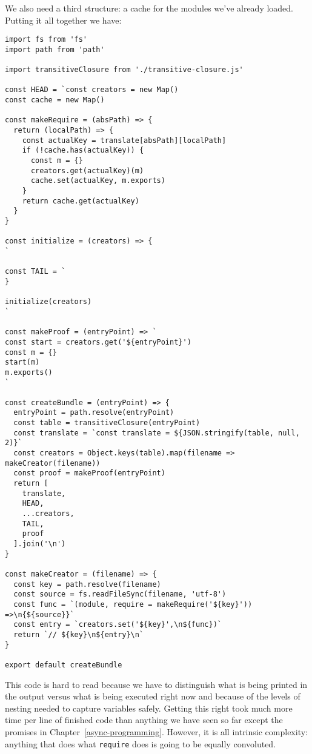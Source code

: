 \documentclass[krantzl]{krantz}
\newcommand{\chapref}[1]{Chapter~\ref{#1}}
\begin{document}
We also need a third structure:
a cache for the modules we've already loaded.
Putting it all together we have:


\begin{lstlisting}[frame=single,frameround=tttt]
import fs from 'fs'
import path from 'path'

import transitiveClosure from './transitive-closure.js'

const HEAD = `const creators = new Map()
const cache = new Map()

const makeRequire = (absPath) => {
  return (localPath) => {
    const actualKey = translate[absPath][localPath]
    if (!cache.has(actualKey)) {
      const m = {}
      creators.get(actualKey)(m)
      cache.set(actualKey, m.exports)
    }
    return cache.get(actualKey)
  }
}

const initialize = (creators) => {
`

const TAIL = `
}

initialize(creators)
`

const makeProof = (entryPoint) => `
const start = creators.get('${entryPoint}')
const m = {}
start(m)
m.exports()
`

const createBundle = (entryPoint) => {
  entryPoint = path.resolve(entryPoint)
  const table = transitiveClosure(entryPoint)
  const translate = `const translate = ${JSON.stringify(table, null, 2)}`
  const creators = Object.keys(table).map(filename => makeCreator(filename))
  const proof = makeProof(entryPoint)
  return [
    translate,
    HEAD,
    ...creators,
    TAIL,
    proof
  ].join('\n')
}

const makeCreator = (filename) => {
  const key = path.resolve(filename)
  const source = fs.readFileSync(filename, 'utf-8')
  const func = `(module, require = makeRequire('${key}')) =>\n{${source}}`
  const entry = `creators.set('${key}',\n${func})`
  return `// ${key}\n${entry}\n`
}

export default createBundle
\end{lstlisting}



This code is hard to read
because we have to distinguish what is being printed in the output versus what is being executed right now
and because of the levels of nesting needed to capture variables safely.
Getting this right took much more time per line of finished code than anything we have seen so far
except the promises in \chapref{async-programming}.
However,
it is all intrinsic complexity:
anything that does what \texttt{require} does is going to be equally convoluted.
\end{document}
